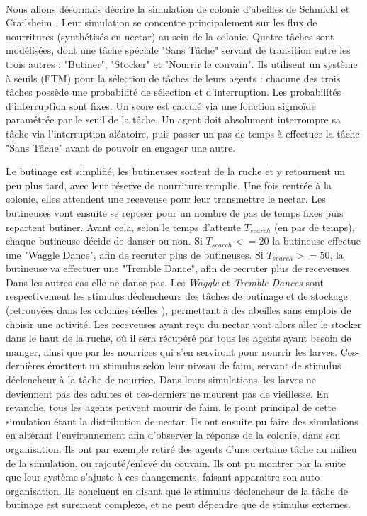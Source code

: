         \paragraph{}
        Nous allons désormais décrire la simulation de colonie d'abeilles de Schmickl et Crailsheim \cite{schmickl_analysing_2008}. Leur simulation se concentre principalement sur les flux de nourritures (synthétisés en nectar) au sein de la colonie. Quatre tâches sont modélisées, dont une tâche spéciale "Sans Tâche" servant de transition entre les trois autres : "Butiner", "Stocker" et "Nourrir le couvain". Ils utilisent un système à seuils (FTM) pour la sélection de tâches de leurs agents : chacune des trois tâches possède une probabilité de sélection et d'interruption. Les probabilités d'interruption sont fixes. Un score est calculé via une fonction sigmoïde paramétrée par le seuil de la tâche. Un agent doit absolument interrompre sa tâche via l'interruption aléatoire, puis passer un pas de temps à effectuer la tâche "Sans Tâche" avant de pouvoir en engager une autre. 
        
        Le butinage est simplifié, les butineuses sortent de la ruche et y retournent un peu plus tard, avec leur réserve de nourriture remplie. Une fois rentrée à la colonie, elles attendent une receveuse pour leur transmettre le nectar. Les butineuses vont ensuite se reposer pour un nombre de pas de temps fixes puis repartent butiner. Avant cela, selon le temps d'attente $T_{search}$ (en pas de temps), chaque butineuse décide de danser ou non. Si $T_{search} <= 20$ la butineuse effectue une "Waggle Dance", afin de recruter plus de butineuses. Si $T_{search} >= 50$, la butineuse va effectuer une "Tremble Dance", afin de recruter plus de receveuses. Dans les autres cas elle ne danse pas. Les \textit{Waggle} et \textit{Tremble Dances} sont respectivement les stimulus déclencheurs des tâches de butinage et de stockage (retrouvées dans les colonies réelles \cite{winston_biology_1991}), permettant à des abeilles sans emplois de choisir une activité. 
        Les receveuses ayant reçu du nectar vont alors aller le stocker dans le haut de la ruche, où il sera récupéré par tous les agents ayant besoin de manger, ainsi que par les nourrices qui s'en serviront pour nourrir les larves. Ces-dernières émettent un stimulus selon leur niveau de faim, servant de stimulus déclencheur à la tâche de nourrice. Dans leurs simulations, les larves ne deviennent pas des adultes et ces-derniers ne meurent pas de vieillesse. En revanche, tous les agents peuvent mourir de faim, le point principal de cette simulation étant la distribution de nectar. Ils ont ensuite pu faire des simulations en altérant l'environnement afin d'observer la réponse de la colonie, dans son organisation. Ils ont par exemple retiré des agents d'une certaine tâche au milieu de la simulation, ou rajouté/enlevé du couvain. Ils ont pu montrer par la suite que leur système s'ajuste à ces changements, faisant apparaitre son auto-organisation. Ils concluent en disant que le stimulus déclencheur de la tâche de butinage est surement complexe, et ne peut dépendre que de stimulus externes.
        
